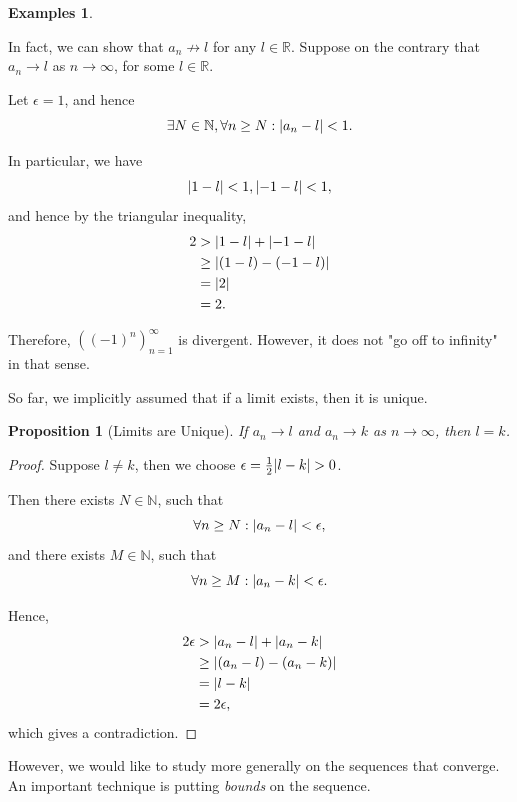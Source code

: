 \documentclass{article}
\newtheorem{proposition}[theorem]{Proposition}
\theoremstyle{definition}
\newtheorem{examples}[theorem]{Examples}
\theoremstyle{remark}
\DeclarePairedDelimiter{\abs}{\lvert}{\rvert}
\newcommand{\pqty}[1]{\left(#1\right)}
\newcommand{\notto}{\not\to}
\newcommand{\NN}{\mathbb{N}}
\newcommand{\RR}{\mathbb{R}}
\begin{document}
\begin{examples}
\begin{enumerate}
        In fact, we can show that \(a_n \notto l\) for any \(l \in \RR\). Suppose on the contrary that \(a_n \to l\) as \(n \to \infty\), for some \(l \in \RR\).

        Let \(\epsilon = 1\), and hence
        \[
            \exists N \in \NN, \forall n \geq N: \abs{a_n - l} < 1.
        \]

        In particular, we have
        \[
            \abs{1 - l} < 1, \abs{-1 - l} < 1,
        \]
        and hence by the triangular inequality,
        \begin{align*}
            2 &> \abs{1 - l} + \abs{-1 - l} \\
            &\geq \abs{\pqty{1 - l} - \pqty{-1 - l}} \\
            &= \abs{2} \\
            &= 2.
        \end{align*}

        Therefore, \(\pqty{\pqty{-1}^n}_{n = 1}^{\infty}\) is divergent. However, it does not "go off to infinity" in that sense.
    \end{enumerate}
\end{examples}

So far, we implicitly assumed that if a limit exists, then it is unique.

\begin{proposition}[Limits are Unique]
    If \(a_n \to l\) and \(a_n \to k\) as \(n \to \infty\), then \(l = k\).
\end{proposition}

\begin{proof}
    Suppose \(l \neq k\), then we choose \(\epsilon = \frac{1}{2} \abs{l - k} > 0\).

    Then there exists \(N \in \NN\), such that
    \[
        \forall n \geq N: \abs{a_n - l} < \epsilon,
    \]
    and there exists \(M \in \NN\), such that
    \[
        \forall n \geq M: \abs{a_n - k} < \epsilon.
    \]

    Hence,
    \begin{align*}
        2\epsilon &> \abs{a_n - l} + \abs{a_n - k} \\
        &\geq \abs{\pqty{a_n - l} - \pqty{a_n - k}} \\
        &= \abs{l - k} \\
        &= 2\epsilon,
    \end{align*}
    which gives a contradiction.
\end{proof}

However, we would like to study more generally on the sequences that converge. An important technique is putting \emph{bounds} on the sequence.
\end{document}

